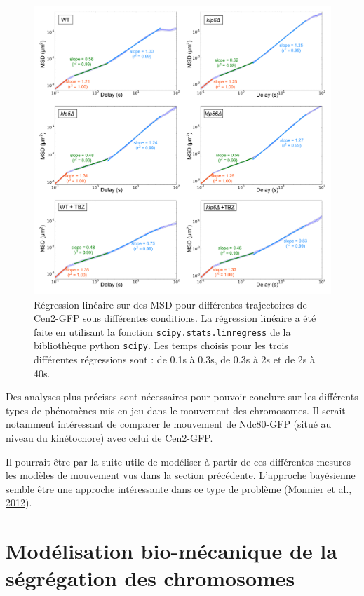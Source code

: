 \documentclass[12pt,a4paper,twoside,openright]{book}
\begin{document}
\begin{figure}[htbp]
\centering
\includegraphics{figures/results/imaging/msds_log_fit.png}
\caption{\label{fig:msds-log-fit}Régression linéaire sur des MSD pour
différentes trajectoires de Cen2-GFP sous différentes conditions. La
régression linéaire a été faite en utilisant la fonction
\texttt{scipy.stats.linregress} de la bibliothèque python
\texttt{scipy}. Les temps choisis pour les trois différentes régressions
sont : de 0.1s à 0.3s, de 0.3s à 2s et de 2s à 40s.}
\end{figure}

Des analyses plus précises sont nécessaires pour pouvoir conclure sur
les différents types de phénomènes mis en jeu dans le mouvement des
chromosomes. Il serait notamment intéressant de comparer le mouvement de
Ndc80-GFP (situé au niveau du kinétochore) avec celui de Cen2-GFP.

Il pourrait être par la suite utile de modéliser à partir de ces
différentes mesures les modèles de mouvement vus dans la section
précédente. L'approche bayésienne semble être une approche intéressante
dans ce type de problème (Monnier et al.,
\protect\hyperlink{ref-Monnier2012}{2012}).

\section{Modélisation bio-mécanique de la ségrégation des
chromosomes}\label{moduxe9lisation-bio-muxe9canique-de-la-suxe9gruxe9gation-des-chromosomes}
\end{document}

